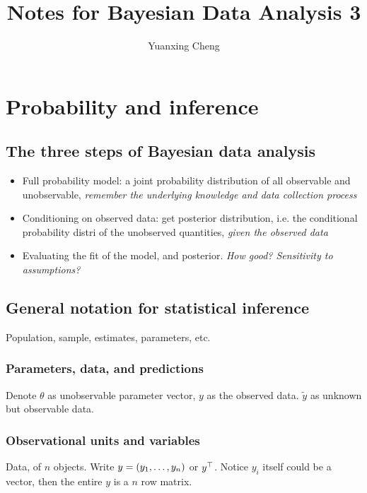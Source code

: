 \documentclass[11pt,a4paper]{article}
\title{Notes for Bayesian Data Analysis 3}
\author{Yuanxing Cheng}
\begin{document}
\maketitle
\tableofcontents
\newpage

\section{Probability and inference}
\subsection{The three steps of Bayesian data analysis}

\begin{itemize}
    \item Full probability model: a joint probability distribution of all observable and unobservable, \emph{remember the underlying knowledge and data collection process}
    \item Conditioning on observed data: get posterior distribution, i.e. the conditional probability distri of the unobserved quantities, \emph{given the observed data}
    \item Evaluating the fit of the model, and posterior. \emph{How good? Sensitivity to assumptions?}
\end{itemize}

\subsection{General notation for statistical inference}

Population, sample, estimates, parameters, etc.

\subsubsection*{Parameters, data, and predictions}

Denote $\theta$ as unobservable parameter vector, \(y\) as the observed data. \(\tilde{y}\) as unknown but observable data.

\subsubsection*{Observational units and variables}

Data, of \(n\) objects. Write \(y=\left( y_1,\dots,y_n \right)\) or \({y}^\top\). Notice \(y_i\) itself could be a vector, then the entire \(y\) is a \(n\) row matrix.
\end{document}
